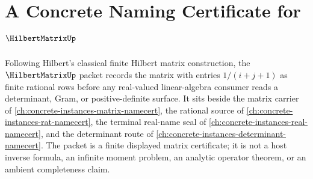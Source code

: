 \chapter{A Concrete Naming Certificate for $\HilbertMatrixUp$}
\label{ch:concrete-instances-hilbert-matrix-namecert}

Following Hilbert's classical finite Hilbert matrix construction, the $\HilbertMatrixUp$ packet records the matrix with entries $1/(i+j+1)$ as finite rational rows before any real-valued linear-algebra consumer reads a determinant, Gram, or positive-definite surface. It sits beside the matrix carrier of \autoref{ch:concrete-instances-matrix-namecert}, the rational source of \autoref{ch:concrete-instances-rat-namecert}, the terminal real-name seal of \autoref{ch:concrete-instances-real-namecert}, and the determinant route of \autoref{ch:concrete-instances-determinant-namecert}. The packet is a finite displayed matrix certificate; it is not a host inverse formula, an infinite moment problem, an analytic operator theorem, or an ambient completeness claim.

